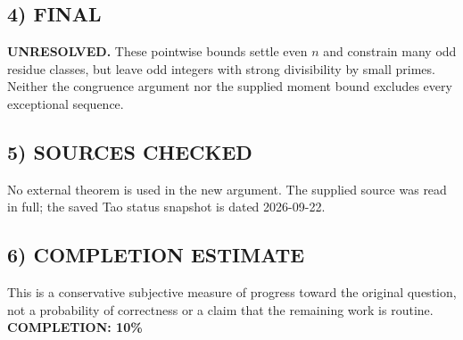 \subsection{4) FINAL}
\textbf{UNRESOLVED.}
These pointwise bounds settle even $n$ and constrain many odd residue classes, but leave odd integers with strong divisibility by small primes. Neither the congruence argument nor the supplied moment bound excludes every exceptional sequence.
\subsection{5) SOURCES CHECKED}
No external theorem is used in the new argument. The supplied source was read in full; the saved Tao status snapshot is dated 2026-09-22.
\subsection{6) COMPLETION ESTIMATE}
This is a conservative subjective measure of progress toward the original question, not a probability of correctness or a claim that the remaining work is routine.
\textbf{COMPLETION: 10\%}
